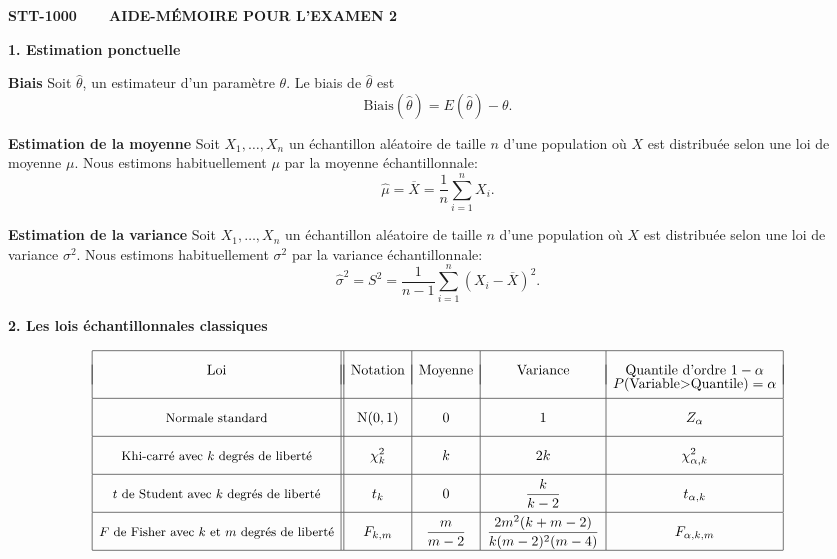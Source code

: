 \documentclass [12pt]{article}
\date{}
\begin{document}
\begin{center}
{\bf STT-1000~~~~AIDE-MÉMOIRE POUR L'EXAMEN 2} \\
\end{center}

\noindent
{\large {\bf 1. Estimation ponctuelle}}

\vspace{0.1in}
\noindent
{\bf Biais} Soit $\hat{\theta}$, un estimateur d'un paramètre $\theta$. Le biais de $\hat{\theta}$ est
$$\mbox{Biais}(\hat{\theta})=E(\hat{\theta})-\theta.$$

\noindent
{\bf Estimation de la moyenne} Soit $X_1,\ldots,X_n$ un échantillon aléatoire de taille $n$ d'une population où
$X$ est distribuée selon une loi de moyenne $\mu$. Nous estimons habituellement $\mu$
par la moyenne échantillonnale:
$$\hat{\mu}=\overline{X}=\frac{1}{n}\sum_{i=1}^nX_i.$$

\vspace{0.1in}
\noindent
{\bf Estimation de la variance} Soit $X_1,\ldots,X_n$ un échantillon aléatoire de taille $n$ d'une population où
$X$ est distribuée selon une loi de variance $\sigma^2$. Nous estimons habituellement
$\sigma^2$ par la variance échantillonnale:
$$\hat{\sigma}^2=S^2=\frac{1}{n-1}\sum_{i=1}^n(X_i-\overline{X})^2.$$


\vspace{0.2in}
{\large {\bf 2. Les lois échantillonnales classiques}}

\begin{small}
\begin{displaymath}
{\renewcommand{\arraystretch}{2}
\begin{array}{|c||c|c|c|c|}
\hline
\mbox{Loi}& \mbox{Notation}& \mbox{Moyenne}& \mbox{Variance} &
\mbox{Quantile d'ordre }1-\alpha\\[-0.5cm]
&&&&P\mbox{(Variable$>$Quantile)}=\alpha\\
\hline
\mbox{\small Normale standard} & \displaystyle \mbox{N}(0,1)
& \displaystyle 0
& \displaystyle 1
& \displaystyle Z_{\alpha}
\\[.10cm]
\hline
\mbox{\small Khi-carré avec $k$ degrés de liberté}
& \displaystyle \chi^2_k
& \displaystyle k
& \displaystyle 2k
& \displaystyle \chi^2_{\alpha,k}
\\[.10cm]
\hline
\mbox{\small $t$ de Student avec $k$ degrés de liberté} &
\displaystyle t_k & \displaystyle 0
& \displaystyle \frac{k}{k-2} & \displaystyle t_{\alpha,k}
\\[.10cm]
\hline
\mbox{\small $F$ de Fisher avec $k$ et $m$ degrés de liberté}
& \displaystyle F_{k,m} & \displaystyle \frac{m}{m-2}
& \displaystyle \frac{2 m^2 (k+m-2)}{k(m-2)^2(m-4)}
& \displaystyle F_{\alpha,k,m}\\[.10cm]
\hline
\end{array}}
\end{displaymath}
\end{small}
\end{document}
